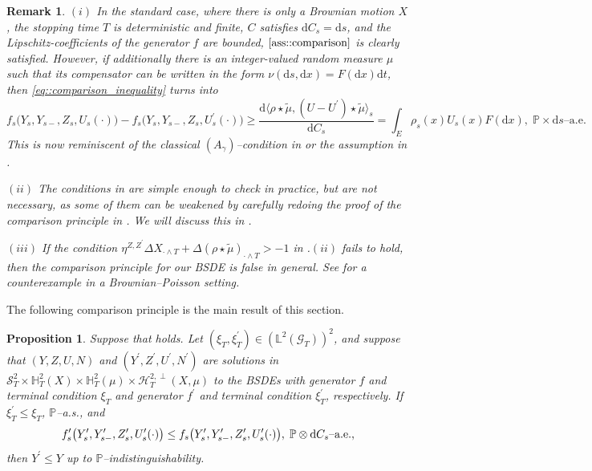 \documentclass[10pt]{article} %
\newtheorem{proposition}[theorem]{Proposition}
\newtheorem{remark}[theorem]{Remark}
\newcommand\cG{\mathcal G}
\newcommand\cH{\mathcal H}
\newcommand\cS{\mathcal S}
\def \H{\mathbb{H}}
\def \L{\mathbb{L}}
\def \P{\mathbb{P}}
\newcommand{\1}{\mathbf{1}}
\def\d{\mathrm{d}}
\begin{document}
\begin{remark}\label{rem::comparison_assumption}
$(i)$ In the standard case, where there is only a Brownian motion $X$, the stopping time $T$ is deterministic and finite, $C$ satisfies $\d C_s = \d s$, and the Lipschitz-coefficients of the generator $f$ are bounded, $\mathrm{\Cref{ass::comparison}}$ is clearly satisfied. However, if additionally there is an integer-valued random measure $\mu$ such that its compensator can be written in the form $\nu(\d s, \d x) = F(\d x)\d t$, then \eqref{eq::comparison_inequality} turns into
	\begin{equation*}
		f_s\big(Y_s,Y_{s-},Z_s,U_s(\cdot)\big) - f_s\big(Y_s,Y_{s-},Z_s,U^\prime_s(\cdot)\big) \geq \frac{\d\langle \rho \star\tilde\mu,(U-U^\prime)\star\tilde\mu\rangle_s}{\d C_s} = \int_E \rho_s(x) U_s(x) F(\d x), \; \text{$\P\times\d s$--a.e.}
	\end{equation*}
	This is now reminiscent of the classical $(A_\gamma)$--condition in {\rm\cite[Section 2.2, p. 1362]{royer2006backward}} or the assumption in {\rm\cite[Theorem 4.1]{quenez2013bsdes}}.

\medskip
$(ii)$ The conditions in {\rm{}} are simple enough to check in practice, but are not necessary, as some of them can be weakened by carefully redoing the proof of the comparison principle in {\rm{}}. We will discuss this in {\rm{}}.

\medskip
$(iii)$ If the condition $\eta^{Z,Z^{\prime}} \Delta X_{\cdot \land T} + \Delta (\rho \star \tilde\mu)_{\cdot \land T} > -1$ in {\rm{}.$(ii)$} fails to hold, then the comparison principle for our {\rm BSDE} is false in general. See {\rm\cite[Example 3.1]{quenez2013bsdes}} for a counterexample in a Brownian--Poisson setting.
\end{remark}

The following comparison principle is the main result of this section.

\begin{proposition}\label{prop::comparison}
	Suppose that {\rm{}} holds. Let $(\xi_T,\xi^\prime_T) \in (\L^2(\cG_T))^2$, and suppose that $(Y,Z,U,N)$ and $(Y^\prime,Z^\prime,U^\prime,N^\prime)$ are solutions in $\cS^2_T \times \H^2_T(X) \times \H^2_T(\mu) \times \cH^{2,\perp}_T(X,\mu)$ to the {\rm BSDEs} with generator $f$ and terminal condition $\xi_T$ and generator $f^\prime$ and terminal condition $\xi^\prime_T$, respectively. If $\xi^\prime_T \leq \xi_T$, $\P${\rm--a.s.}, and
	\begin{equation*}
		f^\prime_s\big(Y^\prime_s,Y^\prime_{s-},Z^\prime_s,U^\prime_s(\cdot)\big) \leq f_s\big(Y^\prime_s,Y^\prime_{s-},Z^\prime_s,U^\prime_s(\cdot)\big), \; \text{$\P \otimes \d C_s$\rm--a.e.},
	\end{equation*}
	 then $Y^\prime \leq Y$ up to $\P$--indistinguishability.	
\end{proposition}
\end{document}
